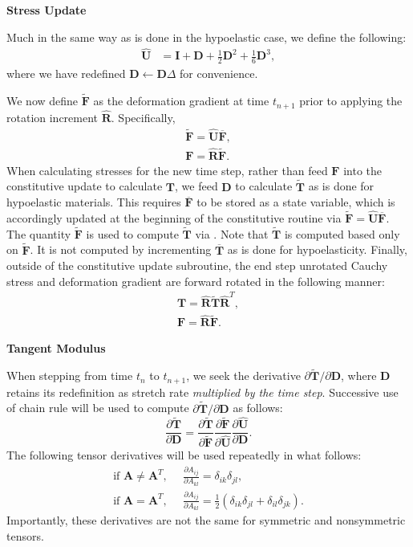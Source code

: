 \textbf{Stress Update}

Much in the same way as is done in the hypoelastic case, we define the following:
\begin{align}
\hat{\bm {U}} &= {\bm I} + {\bm D} + \frac{1}{2}{\bm D}^2 + \frac{1}{6}{\bm D}^3,
\end{align}
where we have redefined ${\bm D}\leftarrow{\bm D}\Delta$ for convenience.

We now define $\tilde {\bm F}$ as the deformation gradient at time $t_{n+1}$ prior to applying the rotation increment $\hat{\bm R}$. Specifically,
\begin{align}
\tilde {\bm F} = \hat{\bm U}\overline{\bm F}, \\
{\bm F} = \hat{\bm R}\tilde {\bm F}.
\end{align}
When calculating stresses for the new time step, rather than feed ${\bm F}$ into the constitutive update to calculate ${\bm T}$, we feed $\bm{D}$ to calculate $\tilde{\bm{T}}$ as is done for hypoelastic materials. This requires $\overline {\bm F}$ to be stored as a state variable, which is accordingly updated at the beginning of the constitutive routine via $\tilde {\bm F} = \hat{\bm U}\overline{\bm F} $. The quantity $\tilde{\bm{F}}$ is used to compute $\tilde{\bm T}$ via . Note that $\tilde{\bm{T}}$ is computed based only on $\tilde{\bm{F}}$. It is not computed by incrementing $\overline{\bm{T}}$ as is done for hypoelasticity. Finally, outside of the constitutive update subroutine, the end step unrotated Cauchy stress and deformation gradient are forward rotated in the following manner:
\begin{gather}
{\bm T} = \hat{\bm R}\tilde{\bm T}\hat{\bm R}^T, \\
\bm{F} = \hat{\bm{R}}\tilde{\bm{F}}.
\end{gather}

\textbf{Tangent Modulus}

When stepping from time $t_n$ to $t_{n+1}$, we seek the derivative $\partial{\tilde{\bm T}}/\partial {\bm D}$, where ${\bm D}$ retains its redefinition as stretch rate \textit{multiplied by the time step}. Successive use of chain rule will be used to compute $\partial \tilde{\bm{T}}/\partial{\bm{D}}$ as follows:
\begin{equation}
\frac{\partial \tilde{\bm T}}{\partial \bm D} = \frac{\partial \tilde{\bm T}}{\partial \tilde{\bm F}}\frac{\partial \tilde{\bm F}}{\partial {\hat {\bm U}}}\frac{\partial \hat{\bm U}}{\partial {\bm D}}.
\label{eq:tanmod}
\end{equation}
The following tensor derivatives will be used repeatedly in what follows:
\begin{align}
\text{if } {\bm A} \neq {\bm A}^T\text{,}\ \ \ &\frac{\partial A_{ij}}{\partial A_{kl}} = \delta_{ik}{\delta_{jl}}, \\
\text{if } {\bm A} = {\bm A}^T\text{,}\ \ \ &\frac{\partial A_{ij}}{\partial A_{kl}} = \frac{1}{2}(\delta_{ik}{\delta_{jl}} + \delta_{il}{\delta_{jk}}).
\end{align}
Importantly, these derivatives are not the same for symmetric and nonsymmetric tensors.

